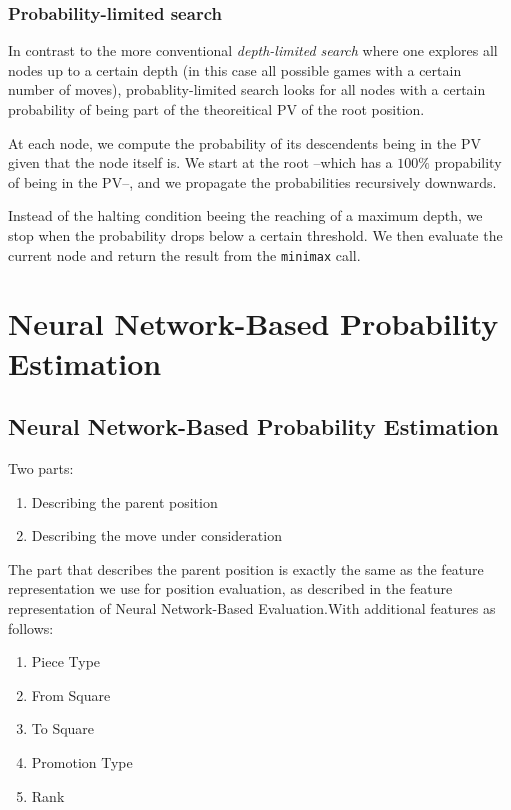 \documentclass[12pt, a4paper]{report}
\begin{document}
    	    \subsection{Probability-limited search}

        	    In contrast to the more conventional \emph{depth-limited search} where one explores all nodes up to a certain depth (in this case all possible games with a certain number of moves), probablity-limited search looks for all nodes with a certain probability of being part of the theoreitical PV of the root position.
            
            	At each node, we compute the probability of its descendents being in the PV given that the node itself is. We start at the root --which has a \(100\%\) propability of being in the PV--, and we propagate the probabilities recursively downwards.
            
            	Instead of the halting condition beeing the reaching of a maximum depth, we stop when the probability drops below a certain threshold. We then evaluate the current node and return the result from the \verb|minimax| call.

	\chapter{Neural Network-Based Probability Estimation}
		\section{Neural Network-Based Probability Estimation}
			Two parts:
			\begin{enumerate}
				\item Describing the parent position
				\item Describing the move under consideration
			\end{enumerate}
			The part that describes the parent position is exactly the same as the feature representation we use for position evaluation, as described in the feature representation of Neural Network-Based Evaluation.With additional features as follows:
			\begin{enumerate}
				\item Piece Type
				\item From Square
				\item To Square
				\item Promotion Type
				\item Rank
			\end{enumerate}
\end{document}
